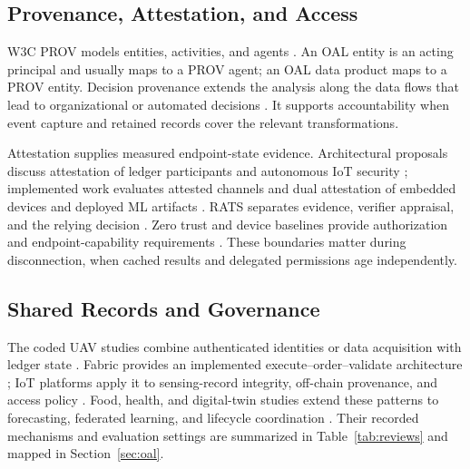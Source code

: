\subsection{Provenance, Attestation, and Access}

W3C PROV models entities, activities, and agents \citep{w3c2013provdm,w3c2013provo}. An OAL entity is an acting principal and usually maps to a PROV agent; an OAL data product maps to a PROV entity. Decision provenance extends the analysis along the data flows that lead to organizational or automated decisions \citep{singh2019decision}. It supports accountability when event capture and retained records cover the relevant transformations.

Attestation supplies measured endpoint-state evidence. Architectural proposals discuss attestation of ledger participants and autonomous IoT security \citep{hardjono2021towards,figueiredo2022arcadian}; implemented work evaluates attested channels and dual attestation of embedded devices and deployed ML artifacts \citep{ott2023universal,baciu2025secure}. RATS separates evidence, verifier appraisal, and the relying decision \citep{birkholz2023remote}. Zero trust and device baselines provide authorization and endpoint-capability requirements \citep{rose2020zero,syed2022zero,fagan2020iot}. These boundaries matter during disconnection, when cached results and delegated permissions age independently.

\subsection{Shared Records and Governance}

The coded UAV studies combine authenticated identities or data acquisition with ledger state \citep{han2022identity,tan2022blockchain,karmakar2024blockchain,islam2019bus}. Fabric provides an implemented execute--order--validate architecture \citep{androulaki2018hyperledger}; IoT platforms apply it to sensing-record integrity, off-chain provenance, and access policy \citep{hang2019design,honarpajooh2021iot,liu2020fabric}. Food, health, and digital-twin studies extend these patterns to forecasting, federated learning, and lifecycle coordination \citep{khan2020iot,rahman2020secure,suhail2022trustworthy}. Their recorded mechanisms and evaluation settings are summarized in Table~\ref{tab:reviews} and mapped in Section~\ref{sec:oal}.

